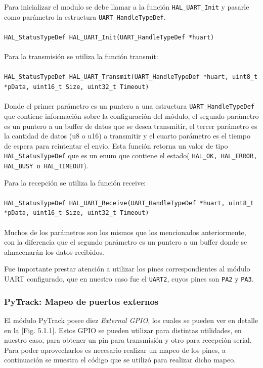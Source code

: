 \documentclass[12pt]{article}
\begin{document}
Para inicializar el modulo se debe llamar a la función \texttt{HAL\_UART\_Init} y pasarle como parámetro la estructura \texttt{UART\_HandleTypeDef}. 
\\\\
\lstinline|HAL_StatusTypeDef HAL_UART_Init(UART_HandleTypeDef *huart)|
\\\\
Para la transmisión se utiliza la función transmit:
\\\\
\lstinline|HAL_StatusTypeDef HAL_UART_Transmit(UART_HandleTypeDef *huart, uint8_t *pData, uint16_t Size, uint32_t Timeout)|
\\\\
Donde el primer parámetro es un puntero a una estructura \texttt{UART\_HandleTypeDef} que contiene información sobre la configuración del módulo, el segundo parámetro es un puntero a un buffer de datos que se desea transmitir, el tercer parámetro es la cantidad de datos (u8 o u16) a transmitir y el cuarto parámetro es el tiempo de espera para reintentar el envio. Esta función retorna un valor de tipo \texttt{HAL\_StatusTypeDef} que es un enum que contiene el estado( \texttt{HAL\_OK, HAL\_ERROR, HAL\_BUSY o HAL\_TIMEOUT}).

Para la recepción se utiliza la función receive:
\\\\
\lstinline|HAL_StatusTypeDef HAL_UART_Receive(UART_HandleTypeDef *huart, uint8_t *pData, uint16_t Size, uint32_t Timeout)|
\\\\
Muchos de los parámetros son los mismos que los mencionados anteriormente, con la diferencia que el segundo parámetro es un puntero a un buffer donde se almacenarán los datos recibidos.

Fue importante prestar atención a utilizar los pines correspondientes al módulo UART configurado, que en nuestro caso fue el \texttt{UART2}, cuyos pines son \texttt{PA2} y \texttt{PA3}.

\subsubsection{PyTrack: Mapeo de puertos externos}
El módulo PyTrack posee diez \textit{External GPIO}, los cuales se pueden ver en detalle en la [Fig. 5.1.1]. Estos GPIO se pueden utilizar para distintas utilidades, en nuestro caso, para obtener un pin para transmisión y otro para recepción serial. Para poder aprovecharlos es necesario realizar un mapeo de los pines, a continuación se muestra el código que se utilizó para realizar dicho mapeo.
\end{document}
